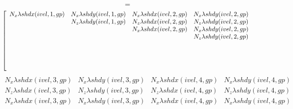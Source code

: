 \documentclass{article}
\begin{document}
\begin{displaymath}  
[K^e_{\lambda}] =
\end{displaymath}
{\tiny
\begin{displaymath}\left[ 
\begin{array}{cccc}    
N_x \lambda shdx(ivel,1,gp) & N_x \lambda shdy(ivel,1,gp) & 
N_x \lambda shdx(ivel,2,gp) & N_x \lambda shdy(ivel,2,gp) \\ 

\null                       & N_z \lambda shdy(ivel,1,gp) & 
N_z \lambda shdx(ivel,2,gp) & N_z \lambda shdy(ivel,2,gp) \\ 
 
\null                       & \null                       & 
N_x \lambda shdx(ivel,2,gp) & N_x \lambda shdy(ivel,2,gp) \\ 

\null                       & \null                       & 
\null                       & N_z \lambda shdy(ivel,2,gp) \\ 

\null                       & \null                       & 
\null                       & \null                       \\ 

\null                       & \null                       & 
\null                       & \null                       \\ 

\null                       & \null                       & 
\null                       & \null                       \\ 

\null                       & \null                       & 
\null                       & \null                       \\ 
\end{array} \right .
\end{displaymath} 
\begin{equation} \left .
\begin{array}{cccc}      
N_x \lambda shdx(ivel,3,gp) & N_x \lambda shdy(ivel,3,gp) &  
N_x \lambda shdx(ivel,4,gp) & N_x \lambda shdy(ivel,4,gp) \\ 

N_z \lambda shdx(ivel,3,gp) & N_z \lambda shdy(ivel,3,gp) & 
N_z \lambda shdx(ivel,4,gp) & N_z \lambda shdy(ivel,4,gp) \\ 
 
N_x \lambda shdx(ivel,3,gp) & N_x \lambda shdy(ivel,3,gp) &  
N_x \lambda shdx(ivel,4,gp) & N_x \lambda shdy(ivel,4,gp) \\ 


\end{array}
\end{equation}}
\end{document}
